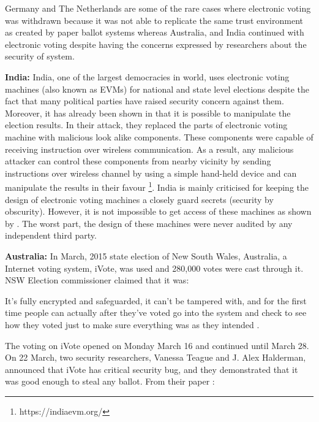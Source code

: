   
  
  Germany and The Netherlands are some of the rare cases where 
  electronic voting was withdrawn because it was not able to 
  replicate the same trust environment as created by paper 
  ballot systems whereas Australia, and India continued 
  with electronic voting despite having the concerns expressed 
  by researchers about the security of system. 
  
  \textbf{India:}
  India, one of the largest democracies in world, 
  uses electronic voting machines (also known as EVMs) for national 
  and state level  elections despite the fact that many political parties have raised security 
  concern against them. Moreover, it has already been shown in \citep{Wolchok:2010:SAI:1866307.1866309}  that it 
  is possible to manipulate the election results. In their attack, they replaced the parts 
  of electronic voting machine  with malicious look alike components. These components 
  were capable of receiving instruction over wireless communication. As a result, any malicious 
  attacker can control these components from nearby vicinity by sending 
  instructions over wireless channel by using a simple hand-held device and 
  can  manipulate the results in their favour \footnote{https://indiaevm.org/}.
  India is mainly criticised for keeping the design of electronic voting machines 
  a closely guard secrets (security by obscurity). However, it is not impossible to get access of 
  these machines as shown by \citep{Wolchok:2010:SAI:1866307.1866309}. 
  The worst part, the design of these machines were never audited by 
  any independent third party. 
  
  

 \textbf{Australia:}
  In March, 2015 state election 
  of New South Wales, Australia, a Internet voting system, iVote,    
  was used and 280,000 votes were cast through it. NSW Election 
  commissioner claimed that it was:
  
  \begin{displayquote} 
  It's fully encrypted and safeguarded, it can't be tampered with, 
 and for the first time people can actually after they've voted 
 go into the system and check to see how they voted just to make 
 sure everything was as they intended \citep{NSWelection}.
 \end{displayquote}
 

  \noindent
  The voting on iVote 
  opened on Monday March 16 and continued until March 28. On 22 March,
  two security researchers, Vanessa Teague and J. Alex Halderman, 
  announced that iVote has critical security bug, and they demonstrated 
  that it was good enough to steal any ballot. From their paper
  \citep{10.1007/978-3-319-22270-7_3}:
  
